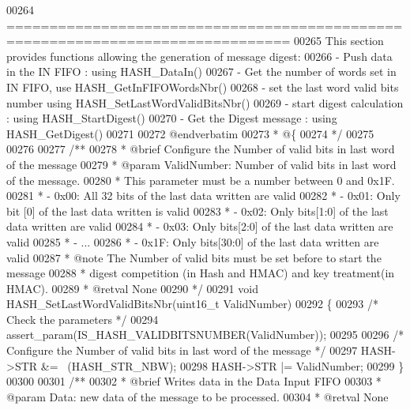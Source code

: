 \begin{DoxyCode}
00264 \textcolor{comment}{ ===============================================================================  }
00265 \textcolor{comment}{  This section provides functions allowing the generation of message digest: }
00266 \textcolor{comment}{  - Push data in the IN FIFO : using HASH\_DataIn()}
00267 \textcolor{comment}{  - Get the number of words set in IN FIFO, use HASH\_GetInFIFOWordsNbr()  }
00268 \textcolor{comment}{  - set the last word valid bits number using HASH\_SetLastWordValidBitsNbr() }
00269 \textcolor{comment}{  - start digest calculation : using HASH\_StartDigest()}
00270 \textcolor{comment}{  - Get the Digest message : using HASH\_GetDigest()}
00271 \textcolor{comment}{ }
00272 \textcolor{comment}{@endverbatim}
00273 \textcolor{comment}{  * @\{}
00274 \textcolor{comment}{  */}
00275 
00276 
00277 \textcolor{comment}{/**}
00278 \textcolor{comment}{  * @brief  Configure the Number of valid bits in last word of the message}
00279 \textcolor{comment}{  * @param  ValidNumber: Number of valid bits in last word of the message.}
00280 \textcolor{comment}{  *           This parameter must be a number between 0 and 0x1F.}
00281 \textcolor{comment}{  *             - 0x00: All 32 bits of the last data written are valid}
00282 \textcolor{comment}{  *             - 0x01: Only bit [0] of the last data written is valid}
00283 \textcolor{comment}{  *             - 0x02: Only bits[1:0] of the last data written are valid}
00284 \textcolor{comment}{  *             - 0x03: Only bits[2:0] of the last data written are valid}
00285 \textcolor{comment}{  *             - ...}
00286 \textcolor{comment}{  *             - 0x1F: Only bits[30:0] of the last data written are valid    }
00287 \textcolor{comment}{  * @note   The Number of valid bits must be set before to start the message }
00288 \textcolor{comment}{  *         digest competition (in Hash and HMAC) and key treatment(in HMAC).    }
00289 \textcolor{comment}{  * @retval None}
00290 \textcolor{comment}{  */}
00291 \textcolor{keywordtype}{void} HASH_SetLastWordValidBitsNbr(uint16\_t ValidNumber)
00292 \{
00293   \textcolor{comment}{/* Check the parameters */}
00294   assert_param(IS\_HASH\_VALIDBITSNUMBER(ValidNumber));
00295 
00296   \textcolor{comment}{/* Configure the Number of valid bits in last word of the message */}
00297   HASH->STR &= ~(HASH_STR_NBW);
00298   HASH->STR |= ValidNumber;
00299 \}
00300 
00301 \textcolor{comment}{/**}
00302 \textcolor{comment}{  * @brief  Writes data in the Data Input FIFO}
00303 \textcolor{comment}{  * @param  Data: new data of the message to be processed.}
00304 \textcolor{comment}{  * @retval None}

\end{DoxyCode}
